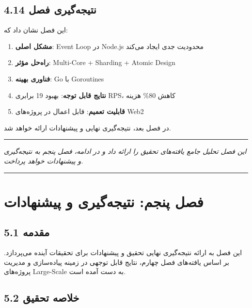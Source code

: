 \documentclass[
]{article}
\providecommand{\tightlist}{%
  \setlength{\itemsep}{0pt}\setlength{\parskip}{0pt}}
\begin{document}
\subsection{4.14 نتیجه‌گیری
فصل}\label{ux646ux62aux6ccux62cux647ux6afux6ccux631ux6cc-ux641ux635ux644}

این فصل نشان داد که:

\begin{enumerate}
\def\labelenumi{\arabic{enumi}.}
\tightlist
\item
  \textbf{مشکل اصلی}: Event Loop در Node.js محدودیت جدی ایجاد می‌کند
\item
  \textbf{راه‌حل مؤثر}: Multi-Core + Sharding + Atomic Design
\item
  \textbf{فناوری بهینه}: Go با Goroutines
\item
  \textbf{نتایج قابل توجه}: بهبود 19 برابری RPS، کاهش 80\% هزینه
\item
  \textbf{قابلیت تعمیم}: قابل اعمال در پروژه‌های Web2
\end{enumerate}

در فصل بعد، نتیجه‌گیری نهایی و پیشنهادات ارائه خواهد شد.

\begin{center}\rule{0.5\linewidth}{0.5pt}\end{center}

\emph{این فصل تحلیل جامع یافته‌های تحقیق را ارائه داد و در ادامه، فصل
پنجم به نتیجه‌گیری و پیشنهادات خواهد پرداخت.}

\begin{center}\rule{0.5\linewidth}{0.5pt}\end{center}

\section{فصل پنجم: نتیجه‌گیری و
پیشنهادات}\label{ux641ux635ux644-ux67eux646ux62cux645-ux646ux62aux6ccux62cux647ux6afux6ccux631ux6cc-ux648-ux67eux6ccux634ux646ux647ux627ux62fux627ux62a}

\subsection{5.1 مقدمه}\label{ux645ux642ux62fux645ux647-3}

این فصل به ارائه نتیجه‌گیری نهایی تحقیق و پیشنهادات برای تحقیقات آینده
می‌پردازد. بر اساس یافته‌های فصل چهارم، نتایج قابل توجهی در زمینه
پیاده‌سازی و مدیریت پروژه‌های Large-Scale به دست آمده است.

\subsection{5.2 خلاصه
تحقیق}\label{ux62eux644ux627ux635ux647-ux62aux62dux642ux6ccux642}
\end{document}
